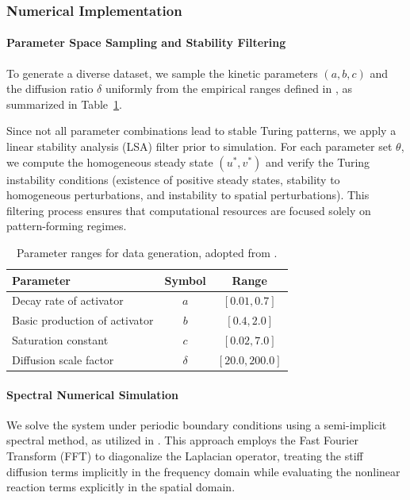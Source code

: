 \documentclass{article} %
\begin{document}
\subsubsection{Numerical Implementation}

\paragraph{Parameter Space Sampling and Stability Filtering}
To generate a diverse dataset, we sample the kinetic parameters $(a, b, c)$ and the diffusion ratio $\delta$ uniformly from the empirical ranges defined in \cite{schnorr2023learning}, as summarized in Table~\ref{tab:param_ranges}.

Since not all parameter combinations lead to stable Turing patterns, we apply a linear stability analysis (LSA) filter prior to simulation. For each parameter set $\theta$, we compute the homogeneous steady state $(u^*, v^*)$ and verify the Turing instability conditions (existence of positive steady states, stability to homogeneous perturbations, and instability to spatial perturbations). This filtering process ensures that computational resources are focused solely on pattern-forming regimes.

\begin{table}[h]
\centering
\caption{Parameter ranges for data generation, adopted from \cite{schnorr2023learning}.}
\label{tab:param_ranges}
\vspace{0.5cm}
\begin{tabular}{|l|c|c|}
\hline
\textbf{Parameter} & \textbf{Symbol} & \textbf{Range} \\ 
\hline
Decay rate of activator & $a$ & $[0.01, 0.7]$ \\
Basic production of activator & $b$ & $[0.4, 2.0]$ \\
Saturation constant & $c$ & $[0.02, 7.0]$ \\
Diffusion scale factor & $\delta$ & $[20.0, 200.0]$ \\ 
\hline
\end{tabular}
\end{table}

\paragraph{Spectral Numerical Simulation}

We solve the system under periodic boundary conditions using a semi-implicit spectral method, as utilized in \cite{schnorr2023learning}. This approach employs the Fast Fourier Transform (FFT) to diagonalize the Laplacian operator, treating the stiff diffusion terms implicitly in the frequency domain while evaluating the nonlinear reaction terms explicitly in the spatial domain.
\end{document}
